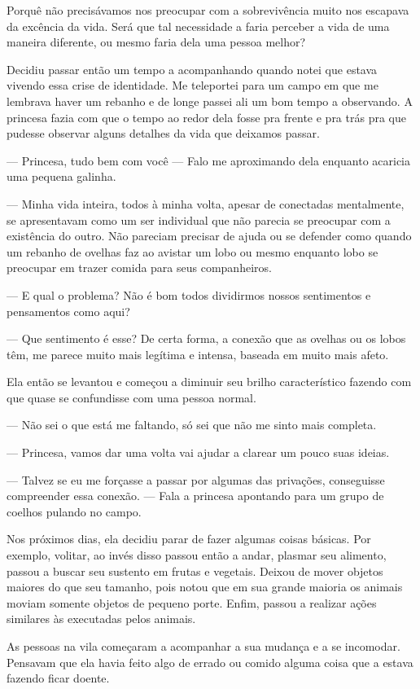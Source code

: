 Porquê não precisávamos nos preocupar com a sobrevivência muito nos escapava da excência da vida. Será que tal necessidade a faria perceber a vida de uma maneira diferente, ou mesmo faria dela uma pessoa melhor?

Decidiu passar então um tempo a acompanhando quando notei que estava vivendo essa crise de identidade. Me teleportei para um campo em que me lembrava haver um rebanho e de longe passei ali um bom tempo a observando. A princesa fazia com que o tempo ao redor dela fosse pra frente e pra trás pra que pudesse observar alguns detalhes da vida que deixamos passar.

— Princesa, tudo bem com você — Falo me aproximando dela enquanto acaricia uma pequena galinha.

— Minha vida inteira, todos à minha volta, apesar de conectadas mentalmente, se apresentavam como um ser individual que não parecia se preocupar com a existência do outro. Não pareciam precisar de ajuda ou se defender como quando um rebanho de ovelhas faz ao avistar um lobo ou mesmo enquanto lobo se preocupar em trazer comida para seus companheiros.

— E qual o problema? Não é bom todos dividirmos nossos sentimentos e pensamentos como aqui?

— Que sentimento é esse? De certa forma, a conexão que as ovelhas ou os lobos têm, me parece muito mais legítima e intensa, baseada em muito mais afeto.

Ela então se levantou e começou a diminuir seu brilho característico fazendo com que quase se confundisse com uma pessoa normal.

— Não sei o que está me faltando, só sei que não me sinto mais completa.

— Princesa, vamos dar uma volta vai ajudar a clarear um pouco suas ideias.

— Talvez se eu me forçasse a passar por algumas das privações, conseguisse compreender essa conexão. — Fala a princesa apontando para um grupo de coelhos pulando no campo.

Nos próximos dias, ela decidiu parar de fazer algumas coisas básicas. Por exemplo, volitar, ao invés disso passou então a andar, plasmar seu alimento, passou a buscar seu sustento em frutas e vegetais. Deixou de mover objetos maiores do que seu tamanho, pois notou que em sua grande maioria os animais moviam somente objetos de pequeno porte. Enfim, passou a realizar ações similares às executadas pelos animais.

As pessoas na vila começaram a acompanhar a sua mudança e a se incomodar. Pensavam que ela havia feito algo de errado ou comido alguma coisa que a estava fazendo ficar doente.

